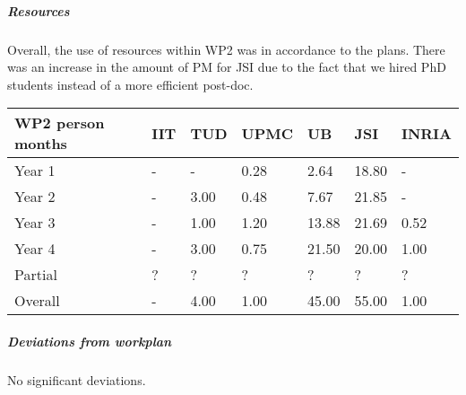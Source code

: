 \subparagraph*{Resources}
Overall, the use of resources within WP2 was in accordance to the plans. There was an increase in the amount of PM for JSI due to the fact that we hired PhD students instead of a more efficient post-doc.
\begin{center}
\begin{tabular}{|C{1.5cm}|C{1.5cm}|C{1.5cm}|C{2cm}|C{2cm}|C{2cm}|C{2cm}|}
\hline
\footnotesize \textbf{WP2 person months}& \footnotesize \textbf{IIT}&\footnotesize \textbf{TUD}&\footnotesize \textbf{UPMC}& \footnotesize \textbf{UB} &\footnotesize \textbf{JSI} & \footnotesize \textbf{INRIA} \\ \hline
\footnotesize Year 1  &  -     & -    & 0.28 & 2.64  & 18.80  & -     \\  \hline
\footnotesize Year 2  &  -     & 3.00 & 0.48 & 7.67  & 21.85  & -     \\  \hline
\footnotesize Year 3  &  -     & 1.00 & 1.20 & 13.88 & 21.69  & 0.52  \\  \hline
\footnotesize Year 4  &  -     & 3.00 & 0.75 & 21.50 & 20.00  & 1.00  \\  \hline 
\footnotesize Partial & ?      & ?    & ?    & ?     & ?      & ?     \\
\hline \hline
\footnotesize Overall & -      & 4.00 & 1.00 & 45.00  & 55.00 & 1.00  \\  \hline
\end{tabular}
\end{center}

\subparagraph*{Deviations from workplan} 
No significant deviations.
